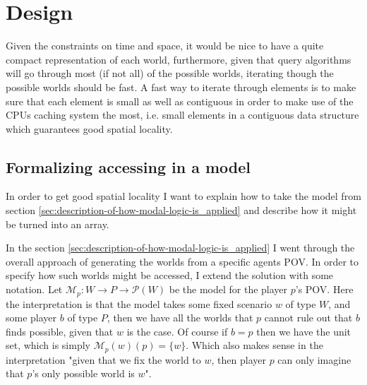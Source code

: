 \section{Design}
\newcommand{\POVModel}{\mathcal{M}}






Given the constraints on time and space, it would be nice to have a quite compact representation of each world, furthermore, given that query algorithms will go through most (if not all) of the possible worlds, iterating though the possible worlds should be fast. A fast way to iterate through elements is to make sure that each element is small as well as contiguous in order to make use of the CPUs caching system the most, i.e. small elements in a contiguous data structure which guarantees good spatial locality.


\subsection{Formalizing accessing in a model} \label{sec:model-access}
In order to get good spatial locality I want to explain how to take the model from section \ref{sec:description-of-how-modal-logic-is_applied} and describe how it might be turned into an array.

In the section \ref{sec:description-of-how-modal-logic-is_applied} I went through the overall approach of generating the worlds from a specific agents POV. In order to specify how such worlds might be accessed, I extend the solution with some notation. Let $\POVModel_p: W \rightarrow P \rightarrow \mathcal{P}(W)$ be the model for the player $p$'s POV. Here the interpretation is that the model takes some fixed scenario $w$ of type $W$, and some player $b$ of type $P$, then we have all the worlds that $p$ cannot rule out that $b$ finds possible, given that $w$ is the case. Of course if $b=p$ then we have the unit set, which is simply $\POVModel_p(w)(p) = \{w\}$. Which also makes sense in the interpretation "given that we fix the world to $w$, then player $p$ can only imagine that $p$'s only possible world is $w$". 

